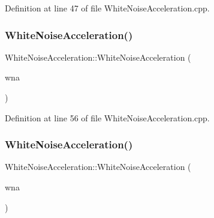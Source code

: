 Definition at line 47 of file White\+Noise\+Acceleration.\+cpp.

\mbox{\label{classbfl_1_1WhiteNoiseAcceleration_ac01e4702a8fbce92a7fd0adf74472e5a}} 
\subsubsection{\texorpdfstring{White\+Noise\+Acceleration()}{WhiteNoiseAcceleration()}\hspace{0.1cm}{\footnotesize\ttfamily [4/5]}}
{\footnotesize\ttfamily White\+Noise\+Acceleration\+::\+White\+Noise\+Acceleration (\begin{DoxyParamCaption}\item[{const \mbox{\hyperlink{classbfl_1_1WhiteNoiseAcceleration}{White\+Noise\+Acceleration}} \&}]{wna }\end{DoxyParamCaption})}



Definition at line 56 of file White\+Noise\+Acceleration.\+cpp.

\mbox{\label{classbfl_1_1WhiteNoiseAcceleration_a74f0f6d44c76e10627765d405de96af6}} 
\subsubsection{\texorpdfstring{White\+Noise\+Acceleration()}{WhiteNoiseAcceleration()}\hspace{0.1cm}{\footnotesize\ttfamily [5/5]}}
{\footnotesize\ttfamily White\+Noise\+Acceleration\+::\+White\+Noise\+Acceleration (\begin{DoxyParamCaption}\item[{\mbox{\hyperlink{classbfl_1_1WhiteNoiseAcceleration}{White\+Noise\+Acceleration}} \&\&}]{wna }\end{DoxyParamCaption})\hspace{0.3cm}{\ttfamily [noexcept]}}



